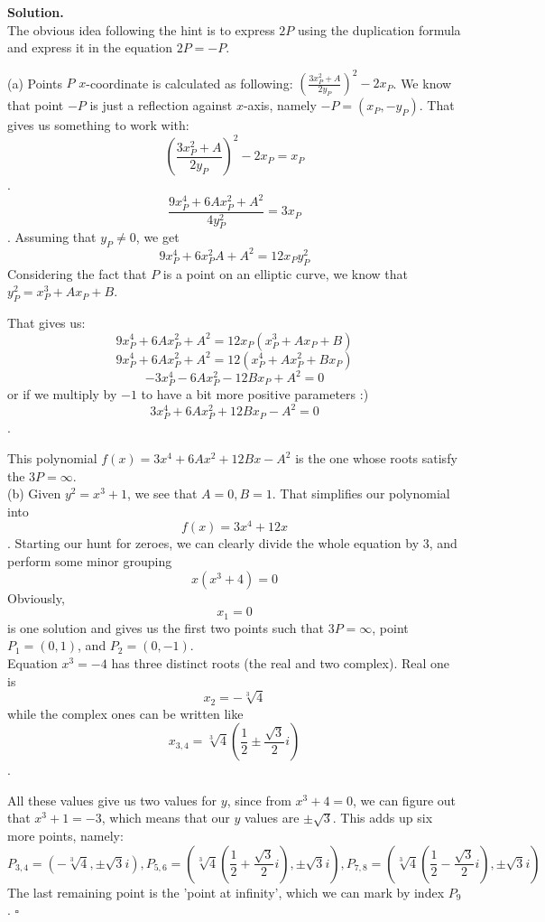 \documentclass[12pt]{article}
\newenvironment{solution}[1][\textbf{Solution}]{\textbf{#1.} }{$\square$}
\begin{document}
\begin{solution}\\
The obvious idea following the hint is to express $2P$ using the duplication formula and express it in the equation $2P = -P$.

(a) Points $P$ $x$-coordinate is calculated as following:
$\left( \frac{3x^2_P + A}{2y_P} \right) ^2 - 2x_P$.
We know that point $-P$ is just a reflection against $x$-axis, namely $-P = (x_P, -y_P)$.
That gives us something to work with: 
$$\left( \frac{3x^2_P + A}{2y_P} \right) ^2 - 2x_P = x_P$$.
$$\frac{9x^4_P + 6Ax^2_P + A^2}{4y^2_P} = 3x_P $$.
Assuming that $y_P \neq 0$, we get $$9x^4_P + 6x^2_PA + A^2 = 12 x_P y^2_P $$
Considering the fact that $P$ is a point on an elliptic curve, we know that $y^2_P = x_P^3 + Ax_P+B$.

That gives us:
$$9x^4_P + 6Ax^2_P + A^2 = 12 x_P (x_P^3 + Ax_P+B)$$
$$9x^4_P + 6Ax^2_P + A^2 = 12 (x_P^4 + Ax^2_P+Bx_P)$$
$$-3x^4_P - 6Ax^2_P - 12Bx_P + A^2 = 0$$ or if we multiply by $-1$ to have a bit more positive parameters :) 
$$3x^4_P + 6Ax^2_P + 12Bx_P - A^2 = 0$$.

This polynomial $f(x) = 3x^4 + 6Ax^2 + 12Bx - A^2$ is the one whose roots satisfy the $3P=\infty$.\\

(b) Given $y^2 = x^3 + 1$, we see that $A=0, B=1$. That simplifies our polynomial into $$f(x) = 3x^4+12x$$. Starting our hunt for zeroes, we can clearly divide the whole equation by $3$, and perform some minor grouping
$$x(x^3+4) = 0$$
Obviously, $$x_1=0$$ is one solution and gives us the first two points such that $3P=\infty$, point $P_1=(0,1)$, and $P_2=(0,-1)$. \\
Equation $x^3 = -4$ has three distinct roots (the real and two complex).
Real one is $$x_2=-\sqrt[3]{4}$$
while the complex ones can be written like $$x_{3,4} = \sqrt[3]{4} \left(\frac{1}{2} \pm \frac{\sqrt{3}}{2} i \right)$$.

All these values give us two values for $y$, since from $x^3 + 4 = 0$, we can figure out that $x^3 + 1 = -3$, which means that our $y$ values are $\pm \sqrt{3}$.
This adds up six more points, namely:
$$P_{3,4}=\left(-\sqrt[3]{4},\pm \sqrt{3}i\right), P_{5,6}=\left(\sqrt[3]{4} \left(\frac{1}{2} + \frac{\sqrt{3}}{2}i\right),\pm \sqrt{3}i\right), P_{7,8} = \left(\sqrt[3]{4} \left(\frac{1}{2} - \frac{\sqrt{3}}{2}i\right),\pm \sqrt{3}i\right)$$
The last remaining point is the 'point at infinity', which we can mark by index $P_9$.
\end{solution} 
\end{document}
